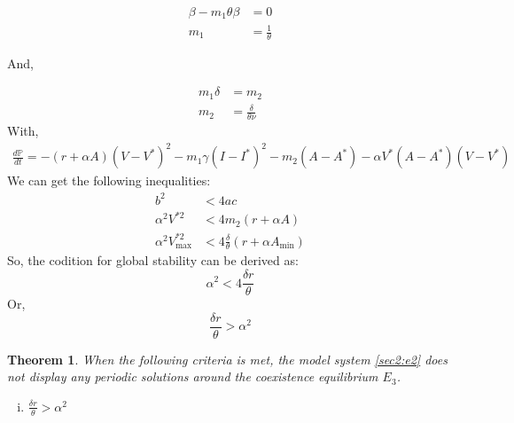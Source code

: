 \documentclass[12pt]{article}
\newtheorem{theorem}{Theorem}[section]
\numberwithin{equation}{section}
\begin{document}
\begin{align}
\beta - m_1\theta\beta &= 0\\
m_1 &= \frac{1}{\theta}
\end{align}

And,

\begin{align}
m_1\delta &= m_2\\
m_2 &= \frac{\delta}{\theta \nu}
\end{align}
With,
\begin{equation}\label{sec3:e42}
\begin{split}
\frac{d\mathbb P}{dt} = -(r+\alpha A)(V-V^*)^2 - m_1\gamma(I-I^*)^2 - m_2(A-A^*)-\alpha V^*(A-A^*)(V-V^*)
\end{split}
\end{equation}
We can get the following inequalities:
\begin{align}
b^2 &< 4ac\\
\alpha^2V^{*2} &< 4m_2(r+\alpha A)\\
\alpha^2V^{*2}_{\text{max}} &< 4\frac{\delta}{\theta}(r+\alpha A_{\text{min}})
\end{align}
So, the codition for global stability can be derived as:
\begin{equation}
\alpha^2 < 4 \frac{\delta r}{\theta}
\end{equation}
Or,
\begin{equation}
\frac{\delta r}{\theta} > \alpha^2
\end{equation}
\begin{theorem}\label{Theorem 3.5}
When the following criteria is met, the model system \eqref{sec2:e2} does not display any periodic solutions around the coexistence equilibrium $E_3$.
\begin{enumerate}[i)]
\item $\frac{\delta r}{\theta} > \alpha^2$
\end{enumerate}
\end{theorem}
\end{document}
